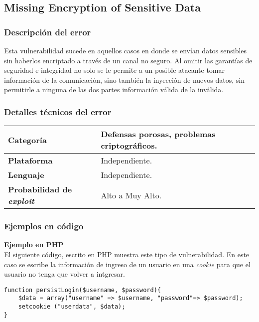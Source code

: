 \subsection{Missing Encryption of Sensitive Data}

\subsubsection{Descripción del error}

Esta vulnerabilidad sucede en aquellos casos en donde se envían datos sensibles sin haberlos encriptado a través de un canal no seguro.
Al omitir las garantías de seguridad e integridad no solo se le permite a un posible atacante tomar información de la comunicación,
sino también la inyección de nuevos datos, sin permitirle a ninguna de las dos partes información válida de la inválida.

\subsubsection{Detalles técnicos del error}
\begin{tabular}[\baselineskip]{|l|p{7cm}|}
  \hline
  \textbf{Categoría} & Defensas porosas, problemas criptográficos. \\
  \hline
  \textbf{Plataforma} & Independiente. \\
  \hline
  \textbf{Lenguaje} & Independiente. \\
  \hline
  \textbf{Probabilidad de \emph{exploit}} & Alto a Muy Alto. \\
  \hline
\end{tabular}

\subsubsection{Ejemplos en código}

\noindent \textbf{Ejemplo en PHP}\\

El siguiente código, escrito en PHP muestra este tipo de vulnerabilidad.
En este caso se escribe la información de ingreso de un usuario en una \textit{cookie} para que el usuario no tenga que volver a intgresar.
\begin{lstlisting}[frame=single]
function persistLogin($username, $password){
    $data = array("username" => $username, "password"=> $password);
    setcookie ("userdata", $data);
}
\end{lstlisting}

